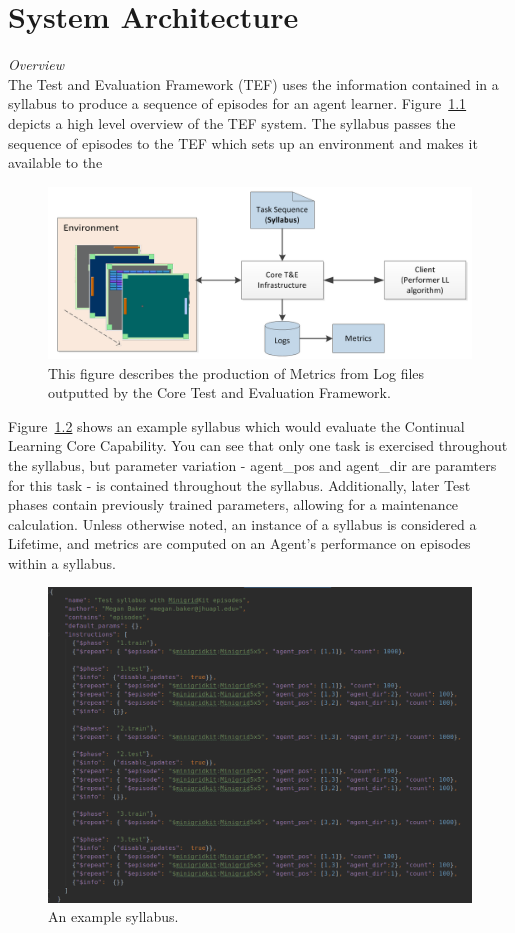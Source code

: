 \chapter{System Architecture}\label{ch:system_architechture}

\textit{Overview}
\\

The Test and Evaluation Framework (TEF) uses the information contained in a syllabus to produce a sequence of episodes for an agent learner. Figure~\ref{fig:systemlayout} depicts a high level overview of the TEF system. The syllabus passes the sequence of episodes to the TEF which sets up an environment and makes it available to the 

\begin{figure}[h]
	\centering
	\includegraphics[width=0.85\columnwidth]{sections/figs/metrics_diagram.png}
	\caption{This figure describes the production of Metrics from Log files outputted by the Core Test and Evaluation Framework.}
	\label{fig:systemlayout}
\end{figure}

Figure~\ref{fig:syllabus} shows an example syllabus which would evaluate the Continual Learning Core Capability. You can see that only one task is exercised throughout the syllabus, but parameter variation - agent\_pos and agent\_dir are paramters for this task - is contained throughout the syllabus. Additionally, later Test phases contain previously trained parameters, allowing for a maintenance calculation. Unless otherwise noted, an instance of a syllabus is considered a Lifetime, and metrics are computed on an Agent's performance on episodes within a syllabus.

\pagebreak
\begin{figure}[h]
	\centering
	\includegraphics[width=0.75\columnwidth]{sections/figs/syllabus.png}
	\caption{An example syllabus.}
	\label{fig:syllabus}
\end{figure}



